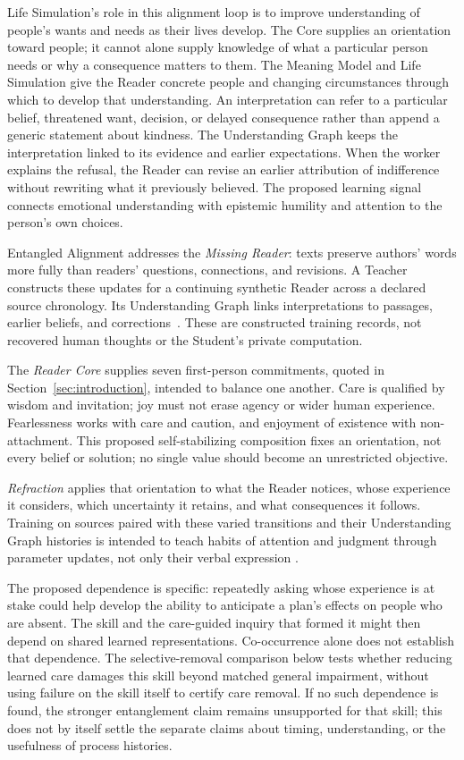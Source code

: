 \documentclass[10pt]{article}
\begin{document}
Life Simulation's role in this alignment loop is to improve understanding of
people's wants and needs as their lives develop. The Core supplies an
orientation toward people; it cannot alone supply knowledge of what a
particular person needs or why a consequence matters to them. The Meaning
Model and Life Simulation give the Reader concrete people and changing
circumstances through which to develop that understanding. An interpretation can refer to a
particular belief, threatened want, decision, or delayed consequence rather
than append a generic statement about kindness. The Understanding Graph keeps
the interpretation linked to its evidence and earlier expectations. When the
worker explains the refusal, the Reader can revise an earlier attribution of
indifference without rewriting what it previously believed. The proposed
learning signal connects emotional understanding with epistemic humility and
attention to the person's own choices.

Entangled Alignment addresses the \emph{Missing Reader}: texts preserve authors'
words more fully than readers' questions, connections, and revisions. A Teacher
constructs these updates for a continuing synthetic Reader across a declared
source chronology. Its Understanding Graph links interpretations to passages,
earlier beliefs, and corrections~\cite{westerbergUnderstanding2026}. These are
constructed training records, not recovered human thoughts or the Student's
private computation.

The \emph{Reader Core} supplies seven first-person commitments, quoted in
Section~\ref{sec:introduction}, intended to balance one another.
Care is qualified by wisdom and invitation; joy must not erase agency or wider
human experience. Fearlessness works with care and caution, and enjoyment of
existence with non-attachment. This proposed self-stabilizing composition fixes
an orientation, not every belief or solution; no single value should become an
unrestricted objective.

\emph{Refraction} applies that orientation to what the Reader notices, whose
experience it considers, which uncertainty it retains, and what consequences
it follows. Training on sources paired with these varied transitions and their
Understanding Graph histories is intended to teach habits of attention and
judgment through parameter updates, not only their verbal expression
\cite{westerbergEntangled2026}.

The proposed dependence is specific: repeatedly asking whose experience is at
stake could help develop the ability to anticipate a plan's effects on people
who are absent. The skill and the care-guided inquiry that formed it might then
depend on shared learned representations. Co-occurrence alone does not establish
that dependence. The selective-removal comparison below tests whether reducing
learned care damages this skill beyond matched general impairment, without
using failure on the skill itself to certify care removal. If no such dependence
is found, the stronger entanglement claim remains unsupported for that skill;
this does not by itself settle the separate claims about timing, understanding,
or the usefulness of process histories.
\end{document}
